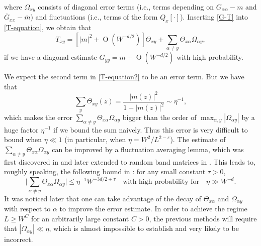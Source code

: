 \documentclass{article}
\newcommand{\1}{\mathds{1}}
\numberwithin{equation}{section}
\newcommand{\al}{\alpha}
\newcommand{\be}{\begin{equation}}
\newcommand{\ee}{\end{equation}}
\newcommand{\e}{{\varepsilon}}
\renewcommand{\leq}{\leqslant}
\renewcommand{\geq}{\geqslant}
\renewcommand{\le}{\leq}
\renewcommand{\ge}{\geq}
\DeclareMathOperator{\OO}{O}
\theoremstyle{plain} %
\theoremstyle{remark}
\begin{document}
where $\Omega_{xy}$ consists of diagonal error terms (i.e., terms depending on $ G_{\al \al}- m$ and $\overline G_{xx}-\overline m$) and fluctuations (i.e., terms of the form  $Q_x[\cdot]$). Inserting \eqref{G-T} into \eqref{T-equation}, we obtain that 
\be\label{T-equation2}
T _{xy} = \left[|m|^2+ \OO( W^{-d/2})\right] \Theta_{xy}  +   \sum_{\al \ne y}\Theta_{x \al}  \Omega_{\al y}  ,
\ee
if we have a diagonal estimate $G_{yy}=m+\OO(W^{-d/2})$ with high probability.




We expect the second term in \eqref{T-equation2} to be an error term. But we have that %
\be\label{sumTheta}\sum_{y}\Theta_{xy}(z)=\frac{|m(z)|^2 }{1-|m(z)|^2 }\sim \eta^{-1},\ee
which makes the error $\sum_{\al \ne y}\Theta_{x\al}\Omega_{\al y}$ bigger than the order of $\max_{\al, y}|\Omega_{\al y}|$ by a huge factor $\eta^{-1}$ if we bound the sum naively. Thus this error is very difficult to bound when $\eta \ll 1$ (in particular, when $\eta=W^2/L^{2-\e}$). The estimate of $\sum_{\al \ne y}\Theta_{x\al}\Omega_{\al y}$ can be improved by a fluctuation averaging lemma, which was first discovered in \cite{EYY bernoulli} and later extended to random band matrices in \cite{EKY_Average}.  This leads to, roughly speaking, the following bound in \cite{delocal}: for any small constant $\tau>0$,
\be
\big|\sum_{\al \ne y}\Theta_{x \al}  \Omega_{\al y}\big| \le \eta^{-1}  W^{-3d/2+\tau} \quad \text{with high probability for}\quad \eta\gg W^{-d}.
\ee
 It was noticed later \cite{PartIII} that one can take advantage of the decay of $\Theta_{x\al}$ and $\Omega_{\al y}$ with respect to $\al$ to improve the error estimate. In order to achieve the regime $L \ge W^C$ for an arbitrarily large constant $C>0$, the previous methods will require that $|\Omega_{\alpha y}| \ll \eta$, which is almost impossible to establish and very  likely to be incorrect.  
\end{document}
